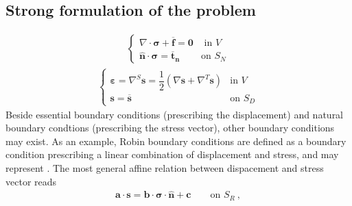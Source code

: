 \documentclass[letterpaper,10pt,english]{jupyterBook}
\begin{document}
\subsection{Strong formulation of the problem}
\label{\detokenize{ch/solids/small-displacements-statics-weak-form-3d:strong-formulation-of-the-problem}}\label{\detokenize{ch/solids/small-displacements-statics-weak-form-3d:solid-mechanics-intro-small-displacements-statics-weak-form-strong}}
\sphinxAtStartPar
{}
\begin{equation*}
\begin{split}\begin{cases}
  \nabla \cdot \boldsymbol \sigma + \overline{\mathbf{f}} =  \mathbf{0} & \text{ in $V$} \\
  \hat{\mathbf{n}} \cdot \boldsymbol\sigma = \overline{\mathbf{t}}_{\mathbf{n}} & \text{on $S_N$}
\end{cases}\end{split}
\end{equation*}
\sphinxAtStartPar
{}
\begin{equation*}
\begin{split}\begin{cases}
\boldsymbol\varepsilon = \nabla^S \mathbf{s} = \dfrac{1}{2} \left( \nabla \mathbf{s} + \nabla^T \mathbf{s} \right) & \text{in $V$} \\
\mathbf{s} = \overline{\mathbf{s}} & \text{on $S_D$}
\end{cases}\end{split}
\end{equation*}
\sphinxAtStartPar
{} Beside essential boundary conditions (prescribing the displacement) and natural boundary condtions (prescribing the stress vector), other boundary conditions may exist. As an example, Robin boundary conditions are defined as a boundary condition prescribing a linear combination of displacement and stress, and may represent . The most general affine relation between dispacement and stress vector reads
\begin{equation*}
\begin{split}\mathbf{a} \cdot \mathbf{s} = \mathbf{b} \cdot \boldsymbol\sigma \cdot \hat{\mathbf{n}} + \mathbf{c}  \qquad \text{on $S_R$} \ ,\end{split}
\end{equation*}
\end{document}
